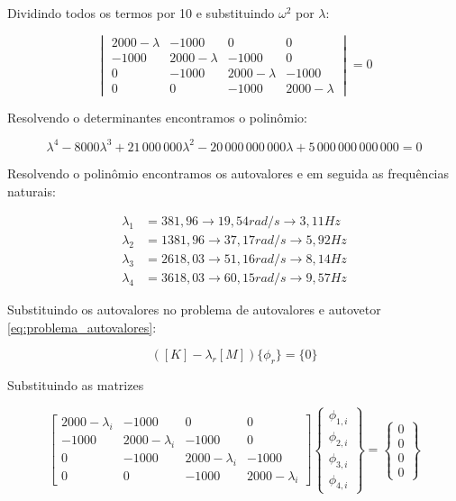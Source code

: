 \documentclass[a4paper, 12pt]{article}
\begin{document}
Dividindo todos os termos por 10 e substituindo $\omega^2$ por $\lambda$:

\begin{equation}
\begin{vmatrix}
2000 - \lambda & -1000 & 0 & 0 \\
-1000 & 2000 - \lambda & -1000 & 0 \\
0 & -1000 & 2000 - \lambda & -1000 \\
0 & 0 & -1000 & 2000 - \lambda
\end{vmatrix}
= 0
\end{equation}

Resolvendo o determinantes encontramos o polinômio:

\begin{equation}
\lambda^4 - 8000\lambda^3
+ 21\,000\,000\lambda^2
- 20\,000\,000\,000\lambda
+ 5\,000\,000\,000\,000 = 0
\end{equation}

Resolvendo o polinômio encontramos os autovalores e em seguida as frequências naturais:


\begin{equation}
\begin{aligned}
\lambda_1 &= 381{,}96 \rightarrow 19,54 rad/s \rightarrow 3,11 Hz\\
\lambda_2 &= 1381{,}96 \rightarrow 37,17 rad/s \rightarrow 5,92 Hz\\
\lambda_3 &= 2618{,}03 \rightarrow 51,16 rad/s \rightarrow 8,14 Hz\\
\lambda_4 &= 3618{,}03 \rightarrow 60,15 rad/s \rightarrow 9,57 Hz
\end{aligned}
\end{equation}

Substituindo os autovalores no problema de autovalores e autovetor \ref{eq:problema_autovalores}:

\begin{equation}
    \left([K] - \lambda_r[M]\right)\{\phi_r\} = \{0\}
\end{equation}

Substituindo as matrizes

\begin{equation}
\begin{bmatrix}
2000-\lambda_i & -1000 & 0 & 0\\
-1000 & 2000-\lambda_i & -1000 & 0\\
0 & -1000 & 2000-\lambda_i & -1000\\
0 & 0 & -1000 & 2000-\lambda_i
\end{bmatrix}
\begin{Bmatrix}
\phi_{1,i}\\
\phi_{2,i}\\
\phi_{3,i}\\
\phi_{4,i}
\end{Bmatrix}
=
\begin{Bmatrix}
0\\
0\\
0\\
0
\end{Bmatrix}
\label{eq:resolvendo autovetores}
\end{equation}
\end{document}
